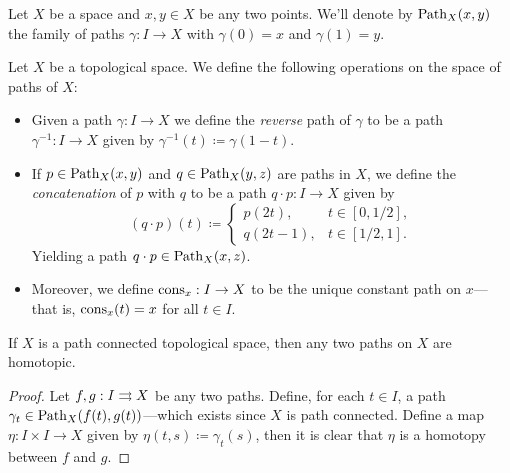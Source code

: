 \begin{notation}
    \label{not:family-of-paths}
    Let \(X\) be a space and \(x, y \in X\) be any two points. We'll denote by
    \(\operatorname{Path}_X(x, y)\) the family of paths \(\gamma: I \to X\) with \(\gamma(0) = x\) and \(\gamma(1) = y\).
\end{notation}

\begin{definition}
    \label{def:operations-paths}
    Let \(X\) be a topological space. We define the following operations on the
    space of paths of \(X\):
    \begin{itemize}\setlength\itemsep{0em}
        \item Given a path \(\gamma: I \to X\) we define the \emph{reverse} path of
              \(\gamma\) to be a path \(\gamma^{-1}: I \to X\) given by
              \(\gamma^{-1}(t) \coloneq \gamma(1 - t)\).

        \item If \(p \in \operatorname{Path}_X(x, y)\) and \(q \in \operatorname{Path}_X(y, z)\) are paths in \(X\),
              we define the \emph{concatenation} of \(p\) with \(q\) to be a path \(q \cdot
              p: I \to X\) given by
              \[
                  (q \cdot p)(t) \coloneq
                  \begin{cases}
                      p(2 t),     & t \in [0, 1/2], \\
                      q(2 t - 1), & t \in [1/2, 1].
                  \end{cases}
              \]
              Yielding a path \(q \cdot p \in \operatorname{Path}_X(x, z)\).

        \item Moreover, we define \(\operatorname{cons}_x: I \to X\) to be the unique constant path
              on \(x\)---that is, \(\operatorname{cons}_x(t) = x\) for all \(t \in I\).
    \end{itemize}
\end{definition}

\begin{proposition}
    \label{prop:path-connected-fundamental-groupoid-trivial}
    If \(X\) is a path connected topological space, then any two paths on \(X\) are
    homotopic.
\end{proposition}

\begin{proof}
    Let \(f, g: I \rightrightarrows X\) be any two paths. Define, for each \(t \in I\), a path
    \(\gamma_t \in
    \operatorname{Path}_X(f(t), g(t))\)---which exists since \(X\) is path connected. Define a map
    \(\eta: I \times I \to X\) given by \(\eta(t, s) \coloneq \gamma_t(s)\), then it
    is clear that \(\eta\) is a homotopy between \(f\) and \(g\).
\end{proof}

